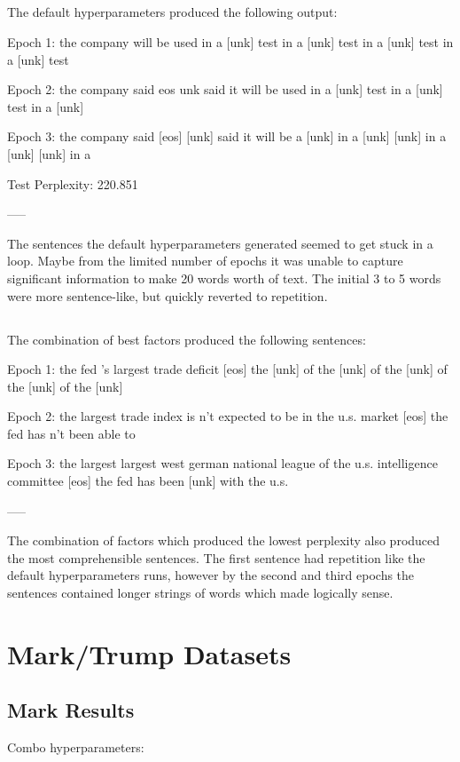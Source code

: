 \documentclass[10pt,a4paper]{article}
\begin{document}
\subsection{}

The default hyperparameters produced the following output:

Epoch 1: the company will be used in a [unk] test in a [unk] test in a [unk] test in a [unk] test

Epoch 2: the company said eos unk said it will be used in a [unk] test in a [unk] test in a [unk]

Epoch 3: the company said [eos] [unk] said it will be a [unk] in a [unk] [unk] in a [unk] [unk] in a

Test Perplexity: 220.851

-----

The sentences the default hyperparameters generated seemed to get stuck in a loop. Maybe from the limited number of epochs it was unable to capture significant information to make 20 words worth of text. The initial 3 to 5 words were more sentence-like, but quickly reverted to repetition.

\subsection{}

The combination of best factors produced the following sentences:

Epoch 1: the fed 's largest trade deficit [eos] the [unk] of the [unk] of the [unk] of the [unk] of the [unk]

Epoch 2: the largest trade index is n't expected to be in the u.s. market [eos] the fed has n't been able to

Epoch 3: the largest largest west german national league of the u.s. intelligence committee [eos] the fed has been [unk] with the u.s.

-----

The combination of factors which produced the lowest perplexity also produced the most comprehensible sentences. The first sentence had repetition like the default hyperparameters runs, however by the second and third epochs the sentences contained longer strings of words which made logically sense.

\section{Mark/Trump Datasets}

\subsection{Mark Results}
Combo hyperparameters:
\end{document}
